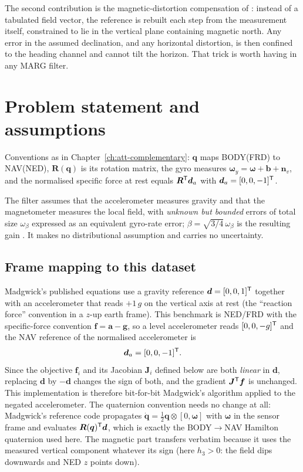 The second contribution is the magnetic-distortion compensation of
\cite[Sec.~3.3]{madgwick2010}: instead of a tabulated field vector, the reference is rebuilt each
step from the measurement itself, constrained to lie in the vertical plane containing magnetic
north. Any error in the assumed declination, and any horizontal distortion, is then confined to the
heading channel and cannot tilt the horizon. That trick is worth having in any MARG filter.

\section{Problem statement and assumptions}
Conventions as in Chapter~\ref{ch:att-complementary}: $\bm{q}$ maps BODY(FRD) to NAV(NED),
$\bm{R}(\bm{q})$ is its rotation matrix, the gyro measures $\bm{\omega}_y=\bm{\omega}+\bm{b}+\bm{n}_v$,
and the normalised specific force at rest equals $\bm{R}^{\mathsf{T}}\bm{d}_a$ with $\bm{d}_a=[0,0,-1]^{\mathsf{T}}$.

The filter assumes that the accelerometer measures gravity and that the magnetometer measures the
local field, with \emph{unknown but bounded} errors of total size $\omega_\beta$ expressed as an
equivalent gyro-rate error; $\beta=\sqrt{3/4}\,\omega_\beta$ is the resulting gain
\cite[Sec.~3.5]{madgwick2010}. It makes no distributional assumption and carries no uncertainty.

\subsection*{Frame mapping to this dataset}
Madgwick's published equations use a gravity reference $\bm{d}=[0,0,1]^{\mathsf{T}}$ together with an
accelerometer that reads $+1\,g$ on the vertical axis at rest (the ``reaction force'' convention in
a $z$-up earth frame). This benchmark is NED/FRD with the specific-force convention
$\bm{f}=\bm{a}-\bm{g}$, so a level accelerometer reads $[0,0,-g]^{\mathsf{T}}$ and the NAV reference of the
normalised accelerometer is
\begin{equation}
\bm{d}_a = [0,0,-1]^{\mathsf{T}} .
\label{eq:mw-da}
\end{equation}
Since the objective $\bm{f}_i$ and its Jacobian $\bm{J}_i$ defined below are both \emph{linear} in
$\bm{d}$, replacing $\bm{d}$ by $-\bm{d}$ changes the sign of both, and the gradient
$\bm{J}^{\mathsf{T}}\bm{f}$ is unchanged. This implementation is therefore bit-for-bit Madgwick's algorithm
applied to the negated accelerometer. The quaternion convention needs no change at all: Madgwick's
reference code propagates $\dot{\bm{q}}=\tfrac12\bm{q}\otimes[0,\bm{\omega}]$ with $\bm{\omega}$ in
the sensor frame and evaluates $\bm{R}(\bm{q})^{\mathsf{T}}\bm{d}$, which is exactly the BODY$\to$NAV Hamilton
quaternion used here. The magnetic part transfers verbatim because it uses the measured vertical
component whatever its sign (here $h_3>0$: the field dips downwards and NED $z$ points down).


